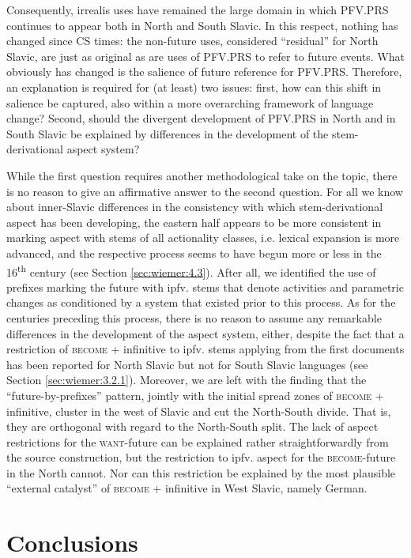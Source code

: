 \documentclass[output=paper,colorlinks,citecolor=brown]{langscibook}
\begin{document}
Consequently, irrealis uses have remained the large domain in which PFV.PRS continues to appear both in North and South Slavic. In this respect, nothing has changed since CS times: the non-future uses, considered “residual” for North Slavic, are just as original as are uses of PFV.PRS to refer to future events. What obviously has changed is the salience of future reference for PFV.PRS. Therefore, an explanation is required for (at least) two issues: first, how can this shift in salience be captured, also within a more overarching framework of language change? Second, should the divergent development of PFV.PRS in North and in South Slavic be explained by differences in the development of the stem\hyp{}derivational aspect system?

While the first question requires another methodological take on the topic, there is no reason to give an affirmative answer to the second question. For all we know about inner-Slavic differences in the consistency with which stem\hyp{}derivational aspect has been developing, the eastern half appears to be more consistent in marking aspect with stems of all actionality classes, i.e. lexical expansion is more advanced, and the respective process seems to have begun more or less in the 16\textsuperscript{th} century (see Section \ref{sec:wiemer:4.3}). After all, we identified the use of prefixes marking the future with ipfv. stems that denote activities and parametric changes as conditioned by a system that existed prior to this process. As for the centuries preceding this process, there is no reason to assume any remarkable differences in the development of the aspect system, either, despite the fact that a restriction of \textsc{become} + infinitive to ipfv. stems applying from the first documents has been reported for North Slavic but not for South Slavic languages (see Section \ref{sec:wiemer:3.2.1}). Moreover, we are left with the finding that the “future-by-prefixes” pattern, jointly with the initial spread zones of \textsc{become} + infinitive, cluster in the west of Slavic and cut the North-South divide. That is, they are orthogonal with regard to the North-South split. The lack of aspect restrictions for the \textsc{want}-future can be explained rather straightforwardly from the source construction, but the restriction to ipfv. aspect for the \textsc{become}-future in the North cannot. Nor can this restriction be explained by the most plausible “external catalyst” of \textsc{become} + infinitive in West Slavic, namely German.

\section{Conclusions}\label{sec:wiemer:6}
\end{document}
